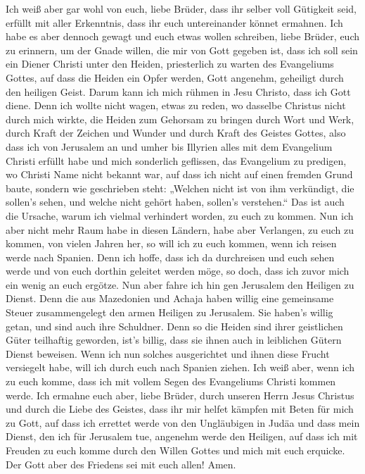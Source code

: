 Ich weiß aber gar wohl von euch, liebe Brüder, dass ihr
selber voll Gütigkeit seid, erfüllt mit aller Erkenntnis, dass ihr euch
untereinander könnet ermahnen.  Ich habe es aber dennoch
gewagt und euch etwas wollen schreiben, liebe Brüder, euch zu erinnern,
um der Gnade willen, die mir von Gott gegeben ist,  dass
ich soll sein ein Diener Christi unter den Heiden, priesterlich zu
warten des Evangeliums Gottes, auf dass die Heiden ein Opfer werden,
Gott angenehm, geheiligt durch den heiligen Geist.  Darum
kann ich mich rühmen in Jesu Christo, dass ich Gott diene.
 Denn ich wollte nicht wagen, etwas zu reden, wo dasselbe
Christus nicht durch mich wirkte, die Heiden zum Gehorsam zu bringen
durch Wort und Werk,  durch Kraft der Zeichen und Wunder
und durch Kraft des Geistes Gottes, also dass ich von Jerusalem an und
umher bis Illyrien alles mit dem Evangelium Christi erfüllt habe
 und mich sonderlich geflissen, das Evangelium zu
predigen, wo Christi Name nicht bekannt war, auf dass ich nicht auf
einen fremden Grund baute,  sondern wie geschrieben
steht: „Welchen nicht ist von ihm verkündigt, die sollen's sehen, und
welche nicht gehört haben, sollen's verstehen.``  Das ist
auch die Ursache, warum ich vielmal verhindert worden, zu euch zu
kommen.  Nun ich aber nicht mehr Raum habe in diesen
Ländern, habe aber Verlangen, zu euch zu kommen, von vielen Jahren her,
 so will ich zu euch kommen, wenn ich reisen werde nach
Spanien. Denn ich hoffe, dass ich da durchreisen und euch sehen werde
und von euch dorthin geleitet werden möge, so doch, dass ich zuvor mich
ein wenig an euch ergötze.  Nun aber fahre ich hin gen
Jerusalem den Heiligen zu Dienst.  Denn die aus
Mazedonien und Achaja haben willig eine gemeinsame Steuer zusammengelegt
den armen Heiligen zu Jerusalem.  Sie haben's willig
getan, und sind auch ihre Schuldner. Denn so die Heiden sind ihrer
geistlichen Güter teilhaftig geworden, ist's billig, dass sie ihnen auch
in leiblichen Gütern Dienst beweisen.  Wenn ich nun
solches ausgerichtet und ihnen diese Frucht versiegelt habe, will ich
durch euch nach Spanien ziehen.  Ich weiß aber, wenn ich
zu euch komme, dass ich mit vollem Segen des Evangeliums Christi kommen
werde.  Ich ermahne euch aber, liebe Brüder, durch
unseren Herrn Jesus Christus und durch die Liebe des Geistes, dass ihr
mir helfet kämpfen mit Beten für mich zu Gott,  auf dass
ich errettet werde von den Ungläubigen in Judäa und dass mein Dienst,
den ich für Jerusalem tue, angenehm werde den Heiligen, 
auf dass ich mit Freuden zu euch komme durch den Willen Gottes und mich
mit euch erquicke.  Der Gott aber des Friedens sei mit
euch allen! Amen.


